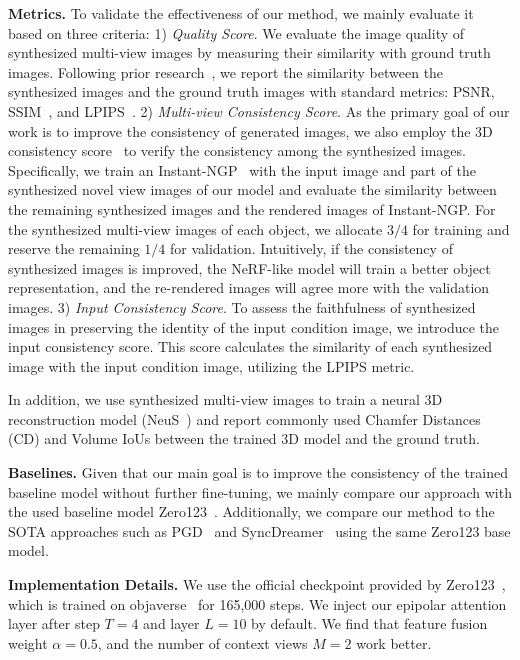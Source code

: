 \noindent\textbf{Metrics.}
To validate the effectiveness of our method, we mainly evaluate it based on three criteria:
1) \textit{Quality Score}. We evaluate the image quality of synthesized multi-view images by measuring their similarity with ground truth images. Following prior research~\cite{zero123, sparsefusion}, we report the similarity between the synthesized images and the ground truth images with standard metrics: PSNR, SSIM~\cite{ssim}, and LPIPS~\cite{lpips}.
2) \textit{Multi-view Consistency Score}. As the primary goal of our work is to improve the consistency of generated images, we also employ the 3D consistency score~\cite{3dim} to verify the consistency among the synthesized images. Specifically, we train an Instant-NGP~\cite{instant_ngp} with the input image and part of the synthesized novel view images of our model and evaluate the similarity between the remaining synthesized images and the rendered images of Instant-NGP. For the synthesized multi-view images of each object, we allocate $3/4$ for training and reserve the remaining $1/4$ for validation.
Intuitively, if the consistency of synthesized images is improved, the NeRF-like model will train a better object representation, and the re-rendered images will agree more with the validation images.
3) \textit{Input Consistency Score}. To assess the faithfulness of synthesized images in preserving the identity of the input condition image, we introduce the input consistency score. This score calculates the similarity of each synthesized image with the input condition image, utilizing the LPIPS metric.

In addition, we use synthesized multi-view images to train a neural 3D reconstruction model (NeuS~\cite{neus}) and report commonly used Chamfer Distances (CD) and Volume IoUs between the trained 3D model and the ground truth.

\noindent\textbf{Baselines.}
Given that our main goal is to improve the consistency of the trained baseline model without further fine-tuning, we mainly compare our approach with the used baseline model Zero123~\cite{zero123}. Additionally, we compare our method to the SOTA approaches such as PGD~\cite{tseng2023consistent} and SyncDreamer~\cite{SyncDreamer} using the same Zero123 base model.

\noindent\textbf{Implementation Details.}
We use the official checkpoint provided by Zero123~\cite{zero123}, which is trained on objaverse~\cite{objaverse} for 165,000 steps. We inject our epipolar attention layer after step $T=4$ and layer $L=10$ by default. We find that feature fusion weight $\alpha=0.5$, and the number of context views $M=2$ work better.

